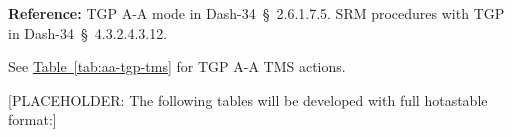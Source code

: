 \documentclass[11pt, a4paper, twoside]{report}
\newenvironment{hotastable}[1]{%
	\footnotesize
	\setlength{\tabcolsep}{3pt}
	\renewcommand{\arraystretch}{1.35}
	\begin{longtable}{L{1.00cm} L{0.90cm} L{0.90cm} L{3.30cm} L{6.40cm} L{1.40cm} L{1.60cm}}
		\caption{#1}\label{table.\thetable}\\
		\addtocontents{hotas}{\protect\contentsline{table}{\protect\numberline{\thetable}#1}{\thepage}{table.\thetable}}%
		\rowcolor{headerblue}
		\multicolumn{1}{>{\centering\arraybackslash}p{1.00cm}}{\textbf{\color{white}Mode}} &
		\multicolumn{1}{>{\centering\arraybackslash}p{0.90cm}}{\textbf{\color{white}Dir.}} &
		\multicolumn{1}{>{\centering\arraybackslash}p{0.90cm}}{\textbf{\color{white}Act.}} &
		\multicolumn{1}{>{\centering\arraybackslash}p{3.30cm}}{\textbf{\color{white}Function}} &
		\multicolumn{1}{>{\centering\arraybackslash}p{6.40cm}}{\textbf{\color{white}Effect / Nuance}} &
		\multicolumn{1}{>{\centering\arraybackslash}p{1.40cm}}{\textbf{\color{white}Dash34}} &
		\multicolumn{1}{>{\centering\arraybackslash}p{1.60cm}}{\textbf{\color{white}Train.}} \\
		\endfirsthead
		\rowcolor{headerblue}
		\multicolumn{1}{>{\centering\arraybackslash}p{1.00cm}}{\textbf{\color{white}Mode}} &
		\multicolumn{1}{>{\centering\arraybackslash}p{0.90cm}}{\textbf{\color{white}Dir.}} &
		\multicolumn{1}{>{\centering\arraybackslash}p{0.90cm}}{\textbf{\color{white}Act.}} &
		\multicolumn{1}{>{\centering\arraybackslash}p{3.30cm}}{\textbf{\color{white}Function}} &
		\multicolumn{1}{>{\centering\arraybackslash}p{6.40cm}}{\textbf{\color{white}Effect / Nuance}} &
		\multicolumn{1}{>{\centering\arraybackslash}p{1.40cm}}{\textbf{\color{white}Dash34}} &
		\multicolumn{1}{>{\centering\arraybackslash}p{1.60cm}}{\textbf{\color{white}Train.}} \\
		\endhead
		\multicolumn{7}{r}{\small\emph{Continued on next page}}\\
		\endfoot
		\endlastfoot
	}{%
	\end{longtable}
}
\newcommand{\dashref}[1]{Dash-34~\S~#1}
\newcommand{\tabref}[1]{\hyperref[#1]{Table~\ref*{#1}}}
\begin{document}
\textbf{Reference:} TGP A-A mode in \dashref{2.6.1.7.5}. SRM procedures 
with TGP in \dashref{4.3.2.4.3.12}.

See \tabref{tab:aa-tgp-tms} for TGP A-A TMS actions.


[PLACEHOLDER: The following tables will be developed with full hotastable format:]




\end{document}
